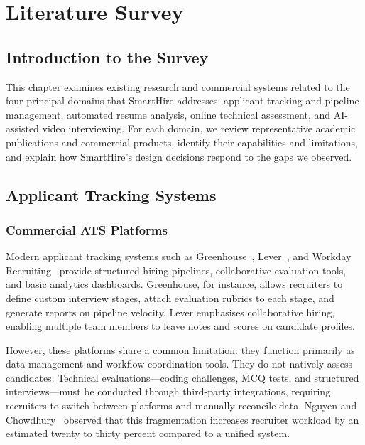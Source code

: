 \setcounter{chapter}{1}
\chapter{Literature Survey}
\label{ch:litsurvey}

\section{Introduction to the Survey}
\label{sec:lit-intro}

This chapter examines existing research and commercial systems related to the four principal domains that SmartHire addresses: applicant tracking and pipeline management, automated resume analysis, online technical assessment, and AI-assisted video interviewing. For each domain, we review representative academic publications and commercial products, identify their capabilities and limitations, and explain how SmartHire's design decisions respond to the gaps we observed.

\section{Applicant Tracking Systems}
\label{sec:ats-review}

\subsection{Commercial ATS Platforms}

Modern applicant tracking systems such as Greenhouse~\cite{greenhouse2024}, Lever~\cite{lever2024}, and Workday Recruiting~\cite{workday2024} provide structured hiring pipelines, collaborative evaluation tools, and basic analytics dashboards. Greenhouse, for instance, allows recruiters to define custom interview stages, attach evaluation rubrics to each stage, and generate reports on pipeline velocity. Lever emphasises collaborative hiring, enabling multiple team members to leave notes and scores on candidate profiles.

However, these platforms share a common limitation: they function primarily as data management and workflow coordination tools. They do not natively assess candidates. Technical evaluations---coding challenges, MCQ tests, and structured interviews---must be conducted through third-party integrations, requiring recruiters to switch between platforms and manually reconcile data. Nguyen and Chowdhury~\cite{nguyen2021} observed that this fragmentation increases recruiter workload by an estimated twenty to thirty percent compared to a unified system.

